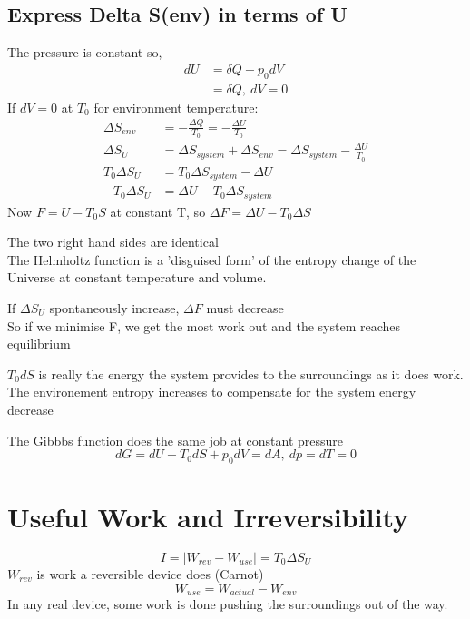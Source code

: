 \documentclass[a4paper, 11pt, normalem]{report}
\begin{document}
\subsection{Express Delta S(env) in terms of U}
The pressure is constant so,
\begin{align*}
    dU &= \delta Q - p_0 dV \\
    &= \delta Q,~ dV = 0
\end{align*}
If $dV = 0$ at $T_0$ for environment temperature:
\begin{align*}
    \Delta S_{env} &= -\frac{\Delta Q}{T_0} = -\frac{\Delta U}{T_0} \\
    \Delta S_{U} &= \Delta S_{system} + \Delta S_{env} = \Delta S_{system} - \frac{\Delta U}{T_0} \\
    T_0 \Delta S_U &= T_0\Delta S_{system} - \Delta U \\
    -T_0 \Delta S_U &= \Delta U - T_0\Delta S_{system}
\end{align*}
Now $F = U - T_0 S$ at constant T, so $\Delta F = \Delta U - T_0 \Delta S$

The two right hand sides are identical \\
The Helmholtz function is a 'disguised form' of the entropy change of the Universe at constant temperature and volume.

If $\Delta S_U$ spontaneously increase, $\Delta F$ must decrease \\
So if we minimise F, we get the most work out and the system reaches equilibrium

$T_0 dS$ is really the energy the system provides to the surroundings as it does work.
The environement entropy increases to compensate for the system energy decrease

The Gibbbs function does the same job at constant pressure
\begin{equation*}
    dG = dU - T_0 dS + p_0 dV = dA,~ dp = dT = 0
\end{equation*}

\section{Useful Work and Irreversibility}
\begin{equation*}
    I = |W_{rev} - W_{use}| = T_0 \Delta S_U
\end{equation*}
$W_{rev}$ is work a reversible device does (Carnot)
\begin{equation*}
    W_{use} = W_{actual} - W_{env}
\end{equation*}
In any real device, some work is done pushing the surroundings out of the way.
\end{document}
